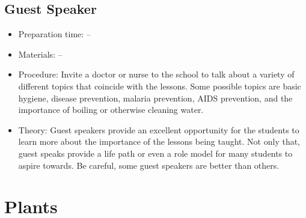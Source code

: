 \subsection{Guest Speaker}
\begin{itemize}
\item{Preparation time: --}
\item{Materials: --}
\item{Procedure: Invite a doctor or nurse to the school to talk about a variety of different topics that coincide with the lessons. Some possible topics are basic hygiene, disease prevention, malaria prevention, AIDS prevention, and the importance of boiling or otherwise cleaning water.}
\item{Theory: Guest speakers provide an excellent opportunity for the students to learn more about the importance of the lessons being taught. Not only that, guest speaks provide a life path or even a role model for many students to aspire towards. Be careful, some guest speakers are better than others.}
\end{itemize}

\section{Plants}



